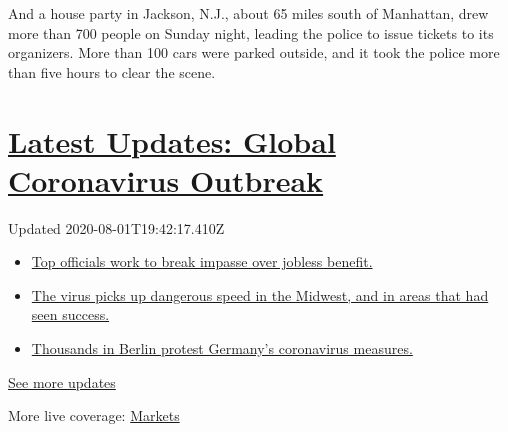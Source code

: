 And a house party in Jackson, N.J., about 65 miles south of Manhattan,
drew more than 700 people on Sunday night, leading the police to issue
tickets to its organizers. More than 100 cars were parked outside, and
it took the police more than five hours to clear the scene.

\hypertarget{latest-updates-global-coronavirus-outbreak}{%
\section{\texorpdfstring{\href{https://www.nytimes3xbfgragh.onion/2020/08/01/world/coronavirus-covid-19.html?action=click\&pgtype=Article\&state=default\&region=MAIN_CONTENT_1\&context=storylines_live_updates}{Latest
Updates: Global Coronavirus
Outbreak}}{Latest Updates: Global Coronavirus Outbreak}}\label{latest-updates-global-coronavirus-outbreak}}

Updated 2020-08-01T19:42:17.410Z

\begin{itemize}
\tightlist
\item
  \href{https://www.nytimes3xbfgragh.onion/2020/08/01/world/coronavirus-covid-19.html?action=click\&pgtype=Article\&state=default\&region=MAIN_CONTENT_1\&context=storylines_live_updates\#link-3ac56579}{Top
  officials work to break impasse over jobless benefit.}
\item
  \href{https://www.nytimes3xbfgragh.onion/2020/08/01/world/coronavirus-covid-19.html?action=click\&pgtype=Article\&state=default\&region=MAIN_CONTENT_1\&context=storylines_live_updates\#link-8796723}{The
  virus picks up dangerous speed in the Midwest, and in areas that had
  seen success.}
\item
  \href{https://www.nytimes3xbfgragh.onion/2020/08/01/world/coronavirus-covid-19.html?action=click\&pgtype=Article\&state=default\&region=MAIN_CONTENT_1\&context=storylines_live_updates\#link-25930521}{Thousands
  in Berlin protest Germany's coronavirus measures.}
\end{itemize}

\href{https://www.nytimes3xbfgragh.onion/2020/08/01/world/coronavirus-covid-19.html?action=click\&pgtype=Article\&state=default\&region=MAIN_CONTENT_1\&context=storylines_live_updates}{See
more updates}

More live coverage:
\href{https://www.nytimes3xbfgragh.onion/live/2020/07/31/business/stock-market-today-coronavirus?action=click\&pgtype=Article\&state=default\&region=MAIN_CONTENT_1\&context=storylines_live_updates}{Markets}

